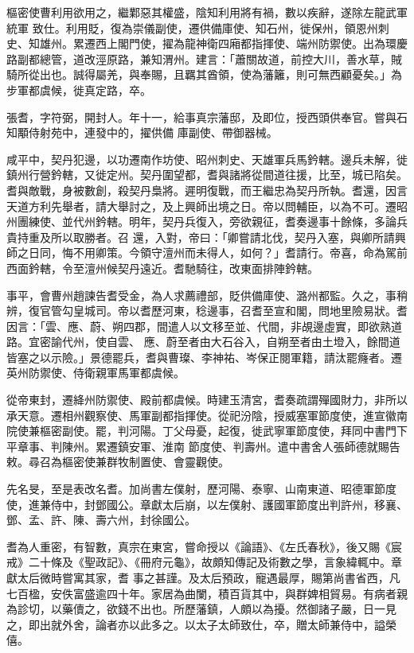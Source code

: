 \begin{pinyinscope}
 樞密使曹利用欲用之，繼鄴惡其權盛，陰知利用將有禍，數以疾辭，遂除左龍武軍統軍
 致仕。利用貶，復為崇儀副使，遷供備庫使、知石州，徙保州，領恩州刺史、知雄州。累遷西上閣門使，擢為龍神衛四廂都指揮使、端州防禦使。出為環慶路副都總管，道改涇原路，兼知渭州。建言：「蕭關故道，前控大川，善水草，賊騎所從出也。誠得屬羌，與奉賜，且羈其酋領，使為藩籬，則可無西顧憂矣。」為步軍都虞候，徙真定路，卒。



 張耆，字符弼，開封人。年十一，給事真宗藩邸，及即位，授西頭供奉官。嘗與石知顒侍射苑中，連發中的，擢供備
 庫副使、帶御器械。



 咸平中，契丹犯邊，以功遷南作坊使、昭州刺史、天雄軍兵馬鈐轄。邊兵未解，徙鎮州行營鈐轄，又徙定州。契丹圍望都，耆與諸將從間道往援，比至，城已陷矣。耆與敵戰，身被數創，殺契丹梟將。遲明復戰，而王繼忠為契丹所執。耆還，因言天道方利先舉者，請大舉討之，及上興師出境之日。帝以問輔臣，以為不可。遷昭州團練使、並代州鈐轄。明年，契丹兵復入，旁欲親征，耆奏邊事十餘條，多論兵貴持重及所以取勝者。召
 還，入對，帝曰：「卿嘗請北伐，契丹入塞，與卿所請興師之日同，悔不用卿策。今領守澶州而未得人，如何？」耆請行。帝喜，命為駕前西面鈐轄，令至澶州候契丹遠近。耆馳騎往，改東面排陣鈐轄。



 事平，會曹州趙諫告耆受金，為人求薦禮部，貶供備庫使、潞州都監。久之，事稍辨，復官管勾皇城司。帝以耆歷河東，稔邊事，召耆至宣和閣，問地里險易狀。耆因言：「雲、應、蔚、朔四郡，間遣人以文移至並、代間，非覘邊虛實，即欲熟道路。宜密諭代州，使自雲、
 應、蔚至者由大石谷入，自朔至者由土墱入，餘間道皆塞之以示險。」景德罷兵，耆與曹璨、李神祐、岑保正閱軍籍，請汰罷癃者。遷英州防禦使、侍衛親軍馬軍都虞候。



 從帝東封，遷絳州防禦使、殿前都虞候。時建玉清宮，耆奏疏謂殫國財力，非所以承天意。遷相州觀察使、馬軍副都指揮使。從祀汾陰，授威塞軍節度使，進宣徽南院使兼樞密副使。罷，判河陽。丁父母憂，起復，徙武寧軍節度使，拜同中書門下平章事、判陳州。累遷鎮安軍、淮南
 節度使、判壽州。遣中書舍人張師德就賜告敕。尋召為樞密使兼群牧制置使、會靈觀使。



 先名旻，至是表改名耆。加尚書左僕射，歷河陽、泰寧、山南東道、昭德軍節度使，進兼侍中，封鄧國公。章獻太后崩，以左僕射、護國軍節度出判許州，移襄、鄧、孟、許、陳、壽六州，封徐國公。



 耆為人重密，有智數，真宗在東宮，嘗命授以《論語》、《左氏春秋》，後又賜《宸戒》二十條及《聖政記》、《冊府元龜》，故頗知傳記及術數之學，言象緯輒中。章獻太后微時嘗寓其家，耆
 事之甚謹。及太后預政，寵遇最厚，賜第尚書省西，凡七百楹，安佚富盛逾四十年。家居為曲闌，積百貨其中，與群婢相貿易。有病者親為診切，以藥儥之，欲錢不出也。所歷藩鎮，人頗以為擾。然御諸子嚴，日一見之，即出就外舍，論者亦以此多之。以太子太師致仕，卒，贈太師兼侍中，謚榮僖。




\end{pinyinscope}
